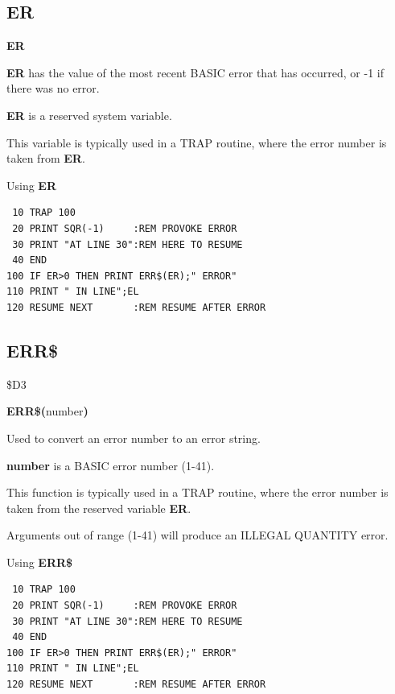 \subsection{ER}
\begin{description}[leftmargin=2cm,style=nextline]
\item [Format:] {\bf ER}
\item [Usage:]  {\bf ER} has the value of the most recent BASIC error that has
               occurred, or -1 if there was no error.
\item [Remarks:] {\bf ER} is a reserved system variable.

This variable is typically used in a TRAP routine,
where the error number is taken from {\bf ER}.

\item [Example:] Using {\bf ER}
\begin{tcolorbox}[colback=black,coltext=white]
\verbatimfont{\codefont}
\begin{verbatim}
 10 TRAP 100
 20 PRINT SQR(-1)     :REM PROVOKE ERROR
 30 PRINT "AT LINE 30":REM HERE TO RESUME
 40 END
100 IF ER>0 THEN PRINT ERR$(ER);" ERROR"
110 PRINT " IN LINE";EL
120 RESUME NEXT       :REM RESUME AFTER ERROR
\end{verbatim}
\end{tcolorbox}
\end{description}


\newpage
\subsection{ERR\$}
\begin{description}[leftmargin=2cm,style=nextline]
\item [Token:] \$D3
\item [Format:] {\bf ERR\$(}number{\bf)}
\item [Usage:] Used to convert
               an error number to an error string.

   {\bf number} is a BASIC error number (1-41).

This function is typically used in a TRAP routine,
where the error number is taken from the reserved variable {\bf ER}.

\item [Remarks:] Arguments out of range (1-41) will
                 produce an ILLEGAL QUANTITY error.

\item [Example:] Using {\bf ERR\$}
\begin{tcolorbox}[colback=black,coltext=white]
\verbatimfont{\codefont}
\begin{verbatim}
 10 TRAP 100
 20 PRINT SQR(-1)     :REM PROVOKE ERROR
 30 PRINT "AT LINE 30":REM HERE TO RESUME
 40 END
100 IF ER>0 THEN PRINT ERR$(ER);" ERROR"
110 PRINT " IN LINE";EL
120 RESUME NEXT       :REM RESUME AFTER ERROR
\end{verbatim}
\end{tcolorbox}
\end{description}

